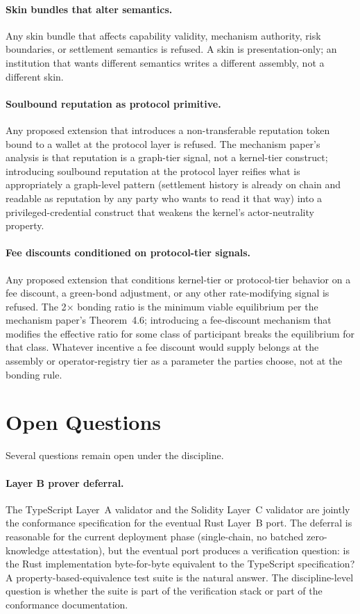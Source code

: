 \documentclass[11pt,a4paper]{article}
\theoremstyle{definition}
\theoremstyle{remark}
\begin{document}
\paragraph{Skin bundles that alter semantics.}
Any skin bundle that affects capability validity, mechanism
authority, risk boundaries, or settlement semantics is refused. A
skin is presentation-only; an institution that wants different
semantics writes a different assembly, not a different skin.

\paragraph{Soulbound reputation as protocol primitive.}
Any proposed extension that introduces a non-transferable
reputation token bound to a wallet at the protocol layer is
refused. The mechanism paper's analysis is that reputation is a
graph-tier signal, not a kernel-tier construct; introducing
soulbound reputation at the protocol layer reifies what is
appropriately a graph-level pattern (settlement history is
already on chain and readable as reputation by any party who
wants to read it that way) into a privileged-credential
construct that weakens the kernel's actor-neutrality property.

\paragraph{Fee discounts conditioned on protocol-tier signals.}
Any proposed extension that conditions kernel-tier or
protocol-tier behavior on a fee discount, a green-bond
adjustment, or any other rate-modifying signal is refused. The
2$\times$ bonding ratio is the minimum viable equilibrium per
the mechanism paper's Theorem~4.6; introducing a fee-discount
mechanism that modifies the effective ratio for some class of
participant breaks the equilibrium for that class. Whatever
incentive a fee discount would supply belongs at the assembly
or operator-registry tier as a parameter the parties choose,
not at the bonding rule.

\section{Open Questions}
\label{sec:open}

Several questions remain open under the discipline.

\paragraph{Layer B prover deferral.}
The TypeScript Layer~A validator and the Solidity Layer~C validator
are jointly the conformance specification for the eventual Rust
Layer~B port. The deferral is reasonable for the current deployment
phase (single-chain, no batched zero-knowledge attestation), but
the eventual port produces a verification question: is the Rust
implementation byte-for-byte equivalent to the TypeScript
specification? A property-based-equivalence test suite is the
natural answer. The discipline-level question is whether the suite
is part of the verification stack or part of the conformance
documentation.
\end{document}
